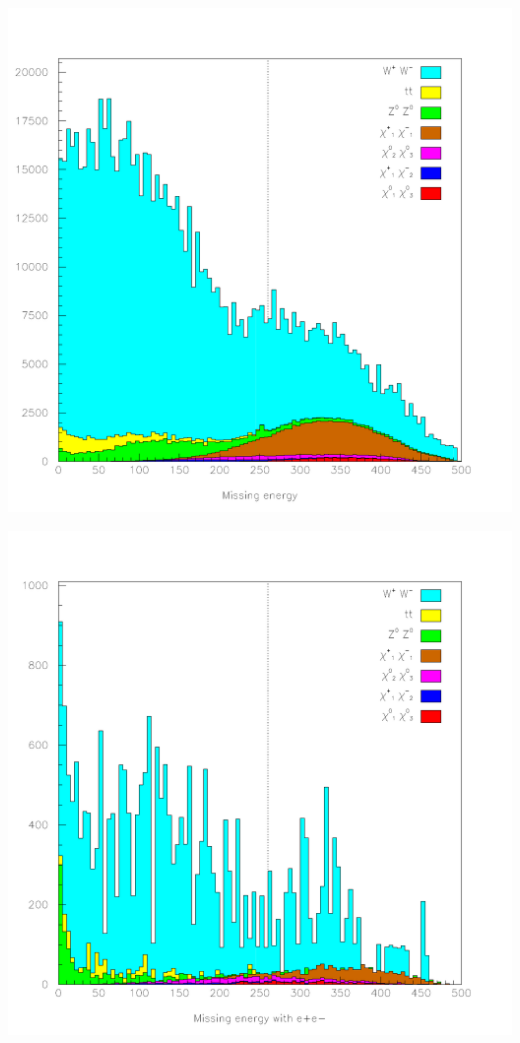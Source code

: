 \documentclass[landscape]{article}
\begin{document}
\huge
\renewcommand{\labelitemi}{-}
\setlength{\parindent}{0 cm}

\begin{center} \includegraphics[height=0.8\textheight]{two_hours_1.pdf} \end{center}
\pagebreak

\begin{center} \includegraphics[height=0.8\textheight]{two_hours_2.pdf} \end{center}
\pagebreak
\end{document}
